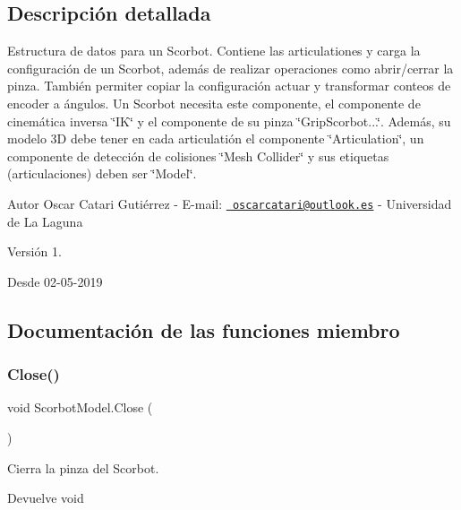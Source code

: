 \subsection{Descripción detallada}
Estructura de datos para un Scorbot. Contiene las articulationes y carga la configuración de un Scorbot, además de realizar operaciones como abrir/cerrar la pinza. También permiter copiar la configuración actuar y transformar conteos de encoder a ángulos. Un Scorbot necesita este componente, el componente de cinemática inversa \char`\"{}\+I\+K\char`\"{} y el componente de su pinza \char`\"{}\+Grip\+Scorbot...\char`\"{}. Además, su modelo 3D debe tener en cada articulatión el componente \char`\"{}\+Articulation\char`\"{}, un componente de detección de colisiones \char`\"{}\+Mesh Collider\char`\"{} y sus etiquetas (articulaciones) deben ser \char`\"{}\+Model\char`\"{}. \begin{DoxyAuthor}{Autor}
Oscar Catari Gutiérrez -\/ E-\/mail\+: \href{mailto:oscarcatari@outlook.es}{\texttt{ oscarcatari@outlook.\+es}} -\/ Universidad de La Laguna 
\end{DoxyAuthor}
\begin{DoxyVersion}{Versión}
1. 
\end{DoxyVersion}
\begin{DoxySince}{Desde}
02-\/05-\/2019 
\end{DoxySince}


\subsection{Documentación de las funciones miembro}
\mbox{\label{class_scorbot_model_a2f4d3c10d7f8ce39bc2fce114efcc97f}} 
\subsubsection{\texorpdfstring{Close()}{Close()}}
{\footnotesize\ttfamily void Scorbot\+Model.\+Close (\begin{DoxyParamCaption}{ }\end{DoxyParamCaption})\hspace{0.3cm}{\ttfamily [inline]}}

Cierra la pinza del Scorbot. \begin{DoxyReturn}{Devuelve}
void 
\end{DoxyReturn}
\mbox{\label{class_scorbot_model_a30c77a2653cea0ff41081d150b7e3bca}} 
